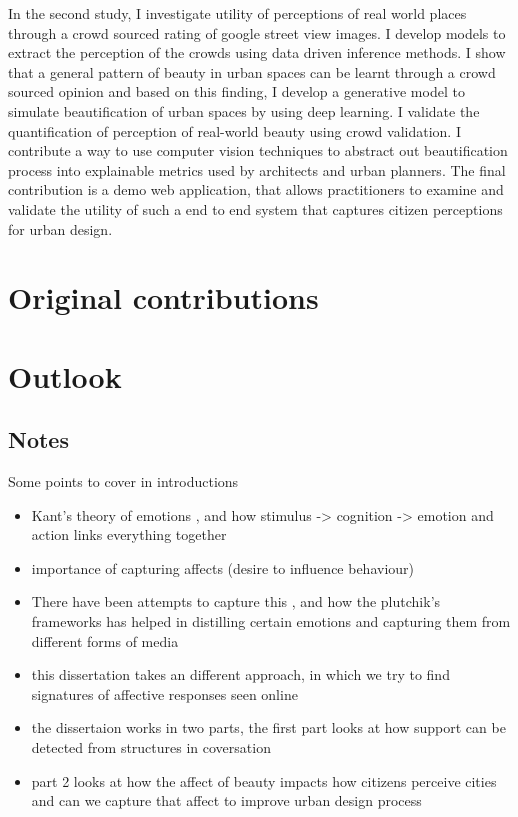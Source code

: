 In the second study, I investigate utility of perceptions of real world places through a crowd sourced rating of google street view images. I develop models to extract the perception of the crowds using data driven inference methods.
I show that a general pattern of beauty in urban spaces can be learnt through a crowd sourced opinion and based on this finding, I develop a generative model to simulate beautification of urban spaces by using deep learning. I validate the quantification of perception of real-world beauty using crowd validation. I contribute a way to use computer vision techniques to abstract out beautification process into explainable metrics used by architects and urban planners. The final contribution is a demo web application, that allows practitioners to examine and validate the utility of such a end to end system that captures citizen perceptions for urban design. 




\section{Original contributions}


\section{Outlook}




\subsection{Notes}

Some points to cover in introductions 

\begin{itemize}
    \item Kant's theory of emotions , and how stimulus -> cognition -> emotion and  action links everything together 
    \item importance of capturing affects (desire to influence behaviour)
    \item There have been attempts to capture this , and how the plutchik's frameworks has helped in distilling certain emotions and capturing them from different forms of media 
    \item this dissertation takes an different approach, in which we try to find signatures of affective responses seen online 
    \item the dissertaion works in two parts, the first part looks at how support can be detected from structures in coversation 
    \item part 2 looks at how the affect of beauty impacts how citizens perceive cities and can we capture that affect to improve urban design process  
\end{itemize}








